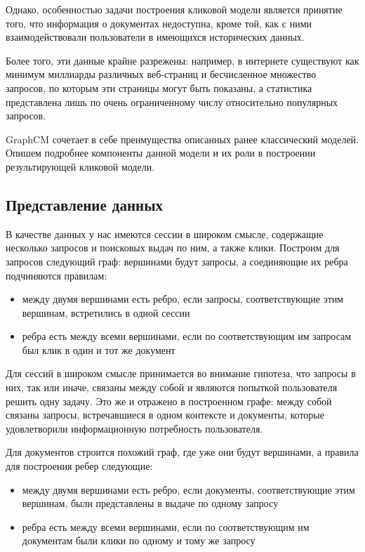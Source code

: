 \documentclass[diploma]{nanolab2015}
\begin{document}
Однако, особенностью задачи построения кликовой модели является принятие того, что информация о документах недоступна, кроме той, как с ними взаимодействовали пользователи в имеющихся исторических данных.

Более того, эти данные крайне разрежены: например, в интернете существуют как минимум миллиарды различных веб-страниц и бесчисленное множество запросов, по которым эти страницы могут быть показаны, а статистика представлена лишь по очень ограниченному числу относительно популярных запросов.

GraphCM \cite{GraphCM} сочетает в себе преимущества описанных ранее классический моделей. Опишем подробнее компоненты данной модели и их роли в построении результирующей кликовой модели.

\subsection{Представление данных}
В качестве данных у нас имеются сессии в широком смысле, содержащие несколько запросов и поисковых выдач по ним, а также клики. Построим для запросов следующий граф: вершинами будут запросы, а соединяющие их ребра подчиняются правилам:
\begin{itemize}
    \item между двумя вершинами есть ребро, если запросы, соответствующие этим вершинам, встретились в одной сессии
    \item ребра есть между всеми вершинами, если по соответствующим им запросам был клик в один и тот же документ
\end{itemize}

Для сессий в широком смысле принимается во внимание гипотеза, что запросы в них, так или иначе, связаны между собой и являются попыткой пользователя решить одну задачу. Это же и отражено в построенном графе: между собой связаны запросы, встречавшиеся в одном контексте и документы, которые удовлетворили информационную потребность пользователя.

Для документов строится похожий граф, где уже они будут вершинами, а правила для построения ребер следующие:
\begin{itemize}
    \item между двумя вершинами есть ребро, если документы, соответствующие этим вершинам, были представлены в выдаче по одному запросу
    \item ребра есть между всеми вершинами, если по соответствующим им документам были клики по одному и тому же запросу
\end{itemize}
\end{document}
